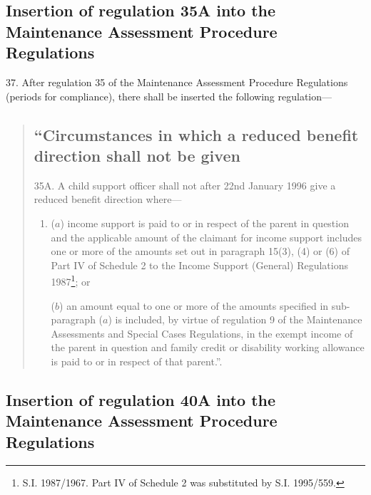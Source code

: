 \documentclass[a4paper]{article}
\begin{document}
\subsection[37. Insertion of regulation 35A into the Maintenance Assessment Procedure Regulations]{Insertion of regulation 35A into the Maintenance Assessment Procedure Regulations}

37.  After regulation 35 of the Maintenance Assessment Procedure Regulations (periods for compliance), there shall be inserted the following regulation—
\begin{quotation}
\subsection*{“Circumstances in which a reduced benefit direction shall not be given}

35A.  A child support officer shall not after 22nd January 1996 give a reduced benefit direction where—
\begin{enumerate}\item[]
($a$) income support is paid to or in respect of the parent in question and the applicable amount of the claimant for income support includes one or more of the amounts set out in paragraph 15(3), (4) or (6) of Part IV of Schedule 2 to the Income Support (General) Regulations 1987\footnote{\frenchspacing S.I. 1987/1967. Part IV of Schedule 2 was substituted by S.I. 1995/559.}; or

($b$) an amount equal to one or more of the amounts specified in sub-paragraph ($a$) is included, by virtue of regulation 9 of the Maintenance Assessments and Special Cases Regulations, in the exempt income of the parent in question and family credit or disability working allowance is paid to or in respect of that parent.”.
\end{enumerate}
\end{quotation}

\subsection[38. Insertion of regulation 40A into the Maintenance Assessment Procedure Regulations]{Insertion of regulation 40A into the Maintenance Assessment Procedure Regulations}
\end{document}
